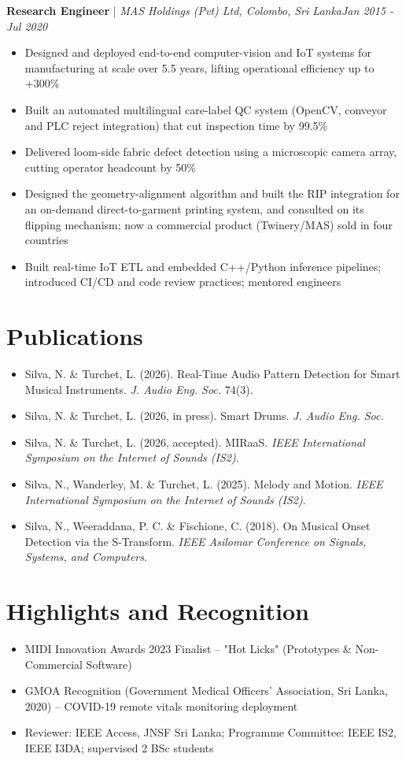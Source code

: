 \documentclass[11pt]{article}
\newenvironment{cvrole}[5]{%
  \par\noindent\textbf{\large #1} | \textit{\small #2, #3}\hfill \textit{\small #4 - #5}\par
  \begin{itemize}[leftmargin=2em, itemsep=-0.3em, topsep=-0.5em]%
}{%
  \end{itemize}\par\noindent\mbox{}\par\vspace{0.1em}%
}
\begin{document}
\begin{cvrole}{Research Engineer}{MAS Holdings (Pvt) Ltd}{Colombo, Sri Lanka}{Jan 2015}{Jul 2020}
    \item Designed and deployed end-to-end computer-vision and IoT systems for manufacturing at scale over 5.5 years, lifting operational efficiency up to +300\%
    \item Built an automated multilingual care-label QC system (OpenCV, conveyor and PLC reject integration) that cut inspection time by 99.5\%
    \item Delivered loom-side fabric defect detection using a microscopic camera array, cutting operator headcount by 50\%
    \item Designed the geometry-alignment algorithm and built the RIP integration for an on-demand direct-to-garment printing system, and consulted on its flipping mechanism; now a commercial product (Twinery/MAS) sold in four countries
    \item Built real-time IoT ETL and embedded C++/Python inference pipelines; introduced CI/CD and code review practices; mentored engineers
\end{cvrole}

\section*{Publications}
\begin{itemize}[leftmargin=1.5em, itemsep=-0.2em]
    \item Silva, N. \& Turchet, L. (2026). Real-Time Audio Pattern Detection for Smart Musical Instruments. \textit{J. Audio Eng. Soc.} 74(3).
    \item Silva, N. \& Turchet, L. (2026, in press). Smart Drums. \textit{J. Audio Eng. Soc.}
    \item Silva, N. \& Turchet, L. (2026, accepted). MIRaaS. \textit{IEEE International Symposium on the Internet of Sounds (IS2)}.
    \item Silva, N., Wanderley, M. \& Turchet, L. (2025). Melody and Motion. \textit{IEEE International Symposium on the Internet of Sounds (IS2)}.
    \item Silva, N., Weeraddana, P. C. \& Fischione, C. (2018). On Musical Onset Detection via the S-Transform. \textit{IEEE Asilomar Conference on Signals, Systems, and Computers}.
\end{itemize}

\section*{Highlights and Recognition}
\begin{itemize}[leftmargin=1.5em, itemsep=-0.2em]
    \item MIDI Innovation Awards 2023 Finalist -- "Hot Licks" (Prototypes \& Non-Commercial Software)
    \item GMOA Recognition (Government Medical Officers' Association, Sri Lanka, 2020) -- COVID-19 remote vitals monitoring deployment
    \item Reviewer: IEEE Access, JNSF Sri Lanka; Programme Committee: IEEE IS2, IEEE I3DA; supervised 2 BSc students
\end{itemize}
\end{document}
